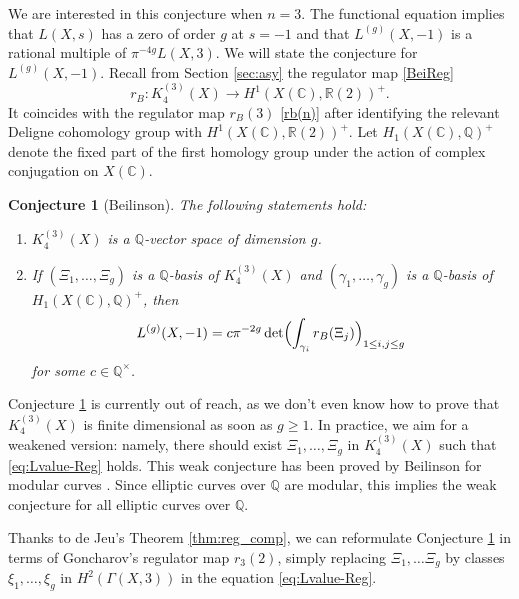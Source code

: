 \documentclass[11pt,a4,leqno]{amsart}
\theoremstyle{my theoremstyle}
\newtheorem{conj}[thm]{Conjecture}
\theoremstyle{dfn}
\theoremstyle{remark}
\renewcommand{\1}{\mathbbm{1}}
\newcommand{\Q}{\mathbb{Q}}
\newcommand{\R}{\mathbb{R}}
\newcommand{\C}{\mathbb{C}}
\numberwithin{equation}{section}
\begin{document}
We are interested in this conjecture when $n=3$. The functional equation implies that $L(X,s)$ has a zero of order $g$ at $s=-1$ and that $L^{(g)}(X,-1)$ is a rational multiple of $\pi^{-4g} L(X,3)$. 
We will state the conjecture for $L^{(g)}(X,-1)$.
Recall from Section \ref{sec:asy} the regulator map \eqref{BeiReg}
\begin{equation*}
    r_B : K_4^{(3)}(X) \longrightarrow H^1(X(\C), \R(2))^+.
\end{equation*}
It coincides with the regulator map $r_B(3)$ \eqref{rb(n)} after identifying the relevant Deligne cohomology group with $H^1(X(\C), \R(2))^+$. Let $H_1(X(\C), \Q)^+$ denote the fixed part of the first homology group under the action of complex conjugation on $X(\C)$.

\begin{conj}[Beilinson] \label{conj:Beilinson}
    The following statements hold:
    \begin{enumerate}
        \item $K_4^{(3)}(X)$ is a $\Q$-vector space of dimension $g$.
        \item If $(\Xi_1, \ldots, \Xi_g)$ is a $\Q$-basis of $K_4^{(3)}(X)$ and $(\gamma_1, \ldots, \gamma_g)$ is a $\Q$-basis of $H_1(X(\C), \Q)^+$, then
        \begin{equation} \label{eq:Lvalue-Reg}
            L^{(g)}(X,-1) = c \pi^{-2g} \det \Bigl(\int_{\gamma_i} r_B(\Xi_j) \Bigr)_{1 \leq i,j \leq g}
        \end{equation}
        for some $c \in \Q^\times$.
    \end{enumerate}
\end{conj}

Conjecture \ref{conj:Beilinson} is currently out of reach, as we don't even know how to prove that $K_4^{(3)}(X)$ is finite dimensional as soon as $g \geq 1$. In practice, we aim for a weakened version: namely, there should exist $\Xi_1, \ldots, \Xi_g$ in $K_4^{(3)}(X)$ such that \eqref{eq:Lvalue-Reg} holds. This weak conjecture has been proved by Beilinson for modular curves \cite{Bei86}. Since elliptic curves over $\Q$ are modular, this implies the weak conjecture for all elliptic curves over $\Q$. 

Thanks to de Jeu's Theorem \ref{thm:reg_comp}, we can reformulate Conjecture \ref{conj:Beilinson} in terms of Goncharov's regulator map $r_3(2)$, simply replacing $\Xi_1, \ldots \Xi_g$ by classes $\xi_1, \ldots, \xi_g$ in $H^2(\Gamma(X,3))$ in the equation \eqref{eq:Lvalue-Reg}.
\end{document}

